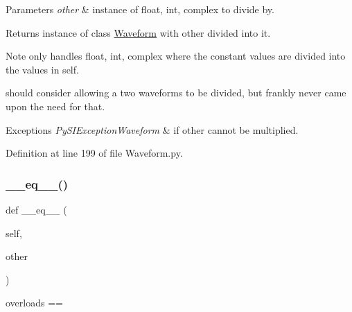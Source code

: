 \begin{DoxyParams}{Parameters}
{\em other} & instance of float, int, complex to divide by. \\
\hline
\end{DoxyParams}
\begin{DoxyReturn}{Returns}
instance of class \hyperlink{classSignalIntegrity_1_1TimeDomain_1_1Waveform_1_1Waveform_1_1Waveform}{Waveform} with other divided into it. 
\end{DoxyReturn}
\begin{DoxyNote}{Note}
only handles float, int, complex where the constant values are divided into the values in self. 

should consider allowing a two waveforms to be divided, but frankly never came upon the need for that. 
\end{DoxyNote}

\begin{DoxyExceptions}{Exceptions}
{\em Py\+S\+I\+Exception\+Waveform} & if other cannot be multiplied. \\
\hline
\end{DoxyExceptions}


Definition at line 199 of file Waveform.\+py.

\mbox{\label{classSignalIntegrity_1_1TimeDomain_1_1Waveform_1_1Waveform_1_1Waveform_ad794ff077f2f05f228a7109f3670ac40}} 
\subsubsection{\texorpdfstring{\+\_\+\+\_\+eq\+\_\+\+\_\+()}{\_\_eq\_\_()}}
{\footnotesize\ttfamily def \+\_\+\+\_\+eq\+\_\+\+\_\+ (\begin{DoxyParamCaption}\item[{}]{self,  }\item[{}]{other }\end{DoxyParamCaption})}



overloads == 


